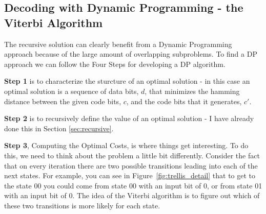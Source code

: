 \documentclass[11pt]{article}
\begin{document}
        \subsection{Decoding with Dynamic Programming - the Viterbi Algorithm}
        \label{sec:viterbi}

        The recursive solution can clearly benefit from a Dynamic Programming
        approach because of the large amount of overlapping subproblems.  To
        find a DP approach we can follow the Four Steps for developing a DP
        algorithm.
        
        \textbf{Step 1} is to characterize the sturcture of an
        optimal solution - in this case an optimal solution is a sequence of
        data bits, $d$, that minimizes the hamming distance between the given
        code bits, $c$, and the code bits that it generates, $c'$.
        
        \textbf{Step 2} is to recursively define the value of an optimal solution - I
        have already done this in Section \ref{sec:recursive}.
        
        \textbf{Step 3}, Computing the Optimal Costs, is where things get
        interesting. To do this, we need to think about the problem a little bit
        differently.  Consider the fact that on every iteration there are two
        possible transitions leading into each of the next states.  For example,
        you can see in Figure~\ref{fig:trellis_detail} that to get to the state 00
        you could come from state 00 with an input bit of
        0, or from state 01 with an input bit of 0.  The idea of the Viterbi
        algorithm is to figure out which of these two transitions is more likely
        for each state.
\end{document}
